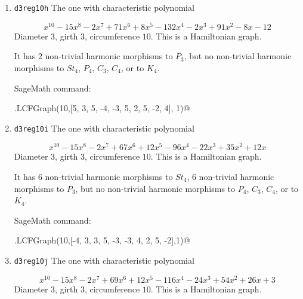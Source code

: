 \documentclass[12pt,letterpaper]{article}
\theoremstyle{definition}
\begin{document}
\begin{enumerate}
\[
x^{10} - 15x^8 - 4x^7 + 75x^6 + 24x^5 - 157x^4 - 36x^3 + 144x^2 + 16x - 48
\]
Diameter $3$,
girth $3$,
circumference $10$.
This is a Hamiltonian graph.

It has $6$ non-trivial harmonic morphisms to $St_4$,
$6$ non-trivial harmonic morphisms to $P_3$, but
no non-trivial harmonic morphisms to $P_4$, $C_3$, $C_4$, or to $K_4$.

SageMath command:

\verb@graphs.LCFGraph(10, [2, -4, -2, 5, 2, 4, -2, 4, 5, -4], 1)@


\item
  {\tt d3reg10h}\newline
The one with %
characteristic polynomial  

\[
x^{10} - 15x^8 - 2x^7 + 71x^6 + 8x^5 - 132x^4 - 2x^3 + 91x^2 - 8x - 12
\]
Diameter $3$,
girth $3$,
circumference $10$.
This is a Hamiltonian graph.

It has $2$ non-trivial harmonic morphisms to $P_3$, but
no non-trivial harmonic morphisms to $St_4$, $P_4$,
$C_3$, $C_4$, or to $K_4$.

SageMath command:

\verb@graphs.LCFGraph(10,[5, 3, 5, -4, -3, 5, 2, 5, -2, 4], 1)@


\item
  {\tt d3reg10i}\newline
The one with %
characteristic polynomial  

\[
x^{10} - 15x^8 - 2x^7 + 67x^6 + 12x^5 - 96x^4 - 22x^3 + 35x^2 + 12x 
\]
Diameter $3$,
girth $3$,
circumference $10$.
This is a Hamiltonian graph.%

It has $6$ non-trivial harmonic morphisms to $St_4$,
$6$ non-trivial harmonic morphisms to $P_3$,
but
no non-trivial harmonic morphisms to $P_4$, $C_3$, $C_4$, or to $K_4$.

SageMath command:

\verb@graphs.LCFGraph(10,[-4, 3, 3, 5, -3, -3, 4, 2, 5, -2],1)@


\item
  {\tt d3reg10j}\newline
The one with %
characteristic polynomial  

\[
x^{10} - 15x^8 - 2x^7 + 69x^6 + 12x^5 - 116x^4 - 24x^3 + 54x^2 + 26x + 3 
\]
Diameter $3$,
girth $3$,
circumference $10$.
This is a Hamiltonian graph.%


\end{enumerate}
\end{document}

